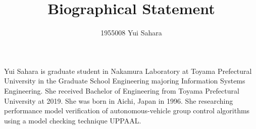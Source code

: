 \documentclass{article}
\title{Biographical Statement}
\author{1955008	Yui Sahara}
\date{}
\begin{document}
\maketitle

	Yui Sahara is graduate student in Nakamura Laboratory at Toyama Prefectural University in the Graduate School Engineering majoring Information Systems Engineering.  She received Bachelor of Engineering from Toyama Prefectural University at 2019.
	She was born in Aichi, Japan in 1996.  She researching performance model verification of autonomous-vehicle group control algorithms using a model checking technique UPPAAL.
\end{document}
